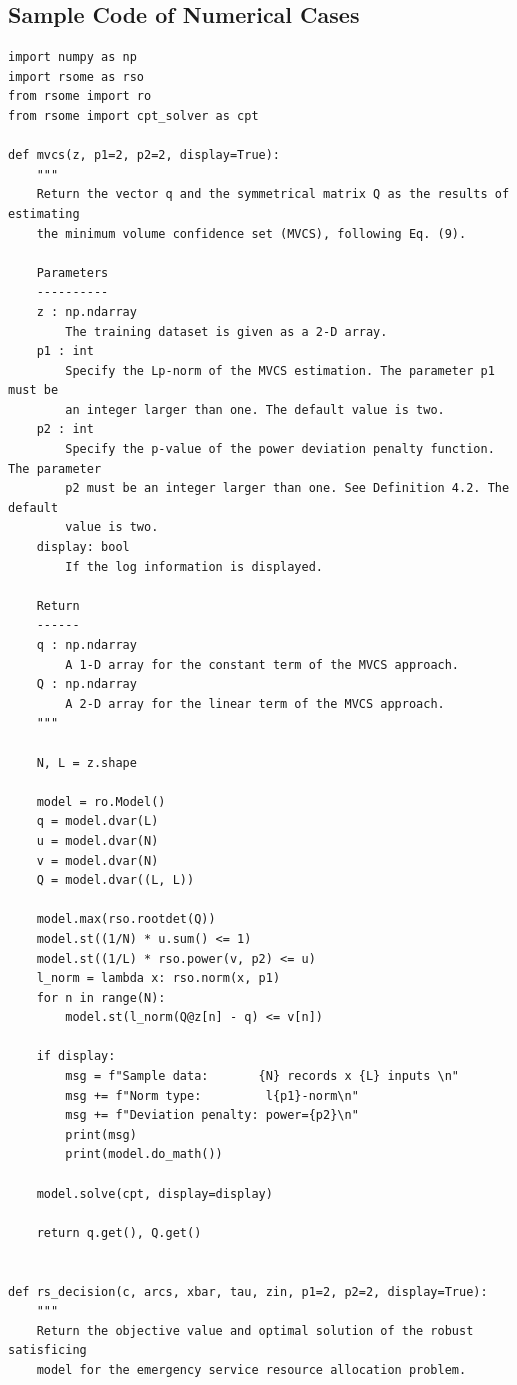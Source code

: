 \documentclass[mnsc, nonblindrev]{informswp}
\newcommand{\1}[1]{\mathds{1}{\left(#1\right)}}
\begin{document}
\begin{appendices}
\newpage
\section{Sample Code of Numerical Cases}
\label{sec:code_numerical}

\begin{lstlisting}
import numpy as np
import rsome as rso
from rsome import ro
from rsome import cpt_solver as cpt

def mvcs(z, p1=2, p2=2, display=True):
    """
    Return the vector q and the symmetrical matrix Q as the results of estimating
    the minimum volume confidence set (MVCS), following Eq. (9).

    Parameters
    ----------
    z : np.ndarray
        The training dataset is given as a 2-D array.
    p1 : int
        Specify the Lp-norm of the MVCS estimation. The parameter p1 must be
        an integer larger than one. The default value is two.
    p2 : int
        Specify the p-value of the power deviation penalty function. The parameter
        p2 must be an integer larger than one. See Definition 4.2. The default
        value is two.
    display: bool
        If the log information is displayed.

    Return
    ------
    q : np.ndarray
        A 1-D array for the constant term of the MVCS approach.
    Q : np.ndarray
        A 2-D array for the linear term of the MVCS approach.
    """

    N, L = z.shape

    model = ro.Model()
    q = model.dvar(L)
    u = model.dvar(N)
    v = model.dvar(N)
    Q = model.dvar((L, L))

    model.max(rso.rootdet(Q))
    model.st((1/N) * u.sum() <= 1)
    model.st((1/L) * rso.power(v, p2) <= u)
    l_norm = lambda x: rso.norm(x, p1)
    for n in range(N):
        model.st(l_norm(Q@z[n] - q) <= v[n])

    if display:
        msg = f"Sample data:       {N} records x {L} inputs \n"
        msg += f"Norm type:         l{p1}-norm\n"
        msg += f"Deviation penalty: power={p2}\n"
        print(msg)
        print(model.do_math())

    model.solve(cpt, display=display)

    return q.get(), Q.get()


def rs_decision(c, arcs, xbar, tau, zin, p1=2, p2=2, display=True):
    """
    Return the objective value and optimal solution of the robust satisficing
    model for the emergency service resource allocation problem.


\end{lstlisting}
\end{appendices}
\end{document}

